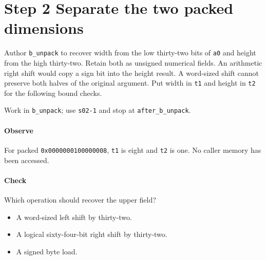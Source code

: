 \section{Step 2 Separate the two packed dimensions}\label{qoi-s02}
Author \texttt{b\_unpack} to recover width from the low thirty-two bits of \texttt{a0} and height from the high thirty-two. Retain both as unsigned numerical fields. An arithmetic right shift would copy a sign bit into the height result. A word-sized shift cannot preserve both halves of the original argument. Put width in \texttt{t1} and height in \texttt{t2} for the following bound checks.

Work in \texttt{b\_unpack}; use \texttt{s02-1} and stop at \texttt{after\_b\_unpack}.

\paragraph{Observe} For packed \texttt{0x0000000100000008}, \texttt{t1} is eight and \texttt{t2} is one. No caller memory has been accessed.

\paragraph{Check} Which operation should recover the upper field?
\begin{itemize}
  \item[A.] A word-sized left shift by thirty-two.
  \item[B.] A logical sixty-four-bit right shift by thirty-two.
  \item[C.] A signed byte load.
\end{itemize}
